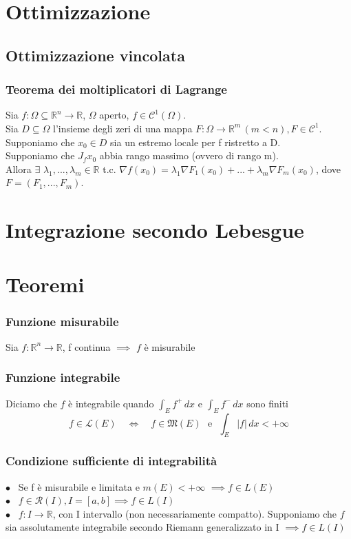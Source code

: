 \documentclass{article} %
\begin{document}
    \section{Ottimizzazione}
    \subsection*{Ottimizzazione vincolata}
    \subsubsection*{Teorema dei moltiplicatori di Lagrange}
    Sia $f:\Omega \subseteq \mathbb{R} ^n \to \mathbb{R}$, $\Omega$ aperto, $f \in \mathcal{C} ^1 (\Omega)$. \\ Sia $D \subseteq \Omega$ l'insieme degli zeri di una mappa $F: \Omega \to \mathbb{R} ^m \, (m<n), F \in \mathcal{C} ^1$. \\ Supponiamo che $x_0 \in D$ sia un estremo locale per f ristretto a D. \\ Supponiamo che $J_f{x_0}$ abbia rango massimo (ovvero di rango m). \\
    Allora $\exists$ $\lambda_1,...,\lambda_m \in \mathbb{R}$ t.c. $\nabla f(x_0) = \lambda_1 \nabla F_1(x_0) + ... + \lambda_m \nabla F_m(x_0)$, dove $F=(F_1, ... , F_m)$.


    \section{Integrazione secondo Lebesgue}
    \section{Teoremi}
    \subsubsection*{Funzione misurabile}
    Sia $f:\mathbb{R} ^n \to \mathbb{R} $, f continua $\implies$ $f$ è misurabile  

    \subsubsection*{Funzione integrabile}
    Diciamo che $f$ è integrabile quando $\int_{E}^{ }f^+\,dx$ e $\int_{E}^{ }f^-\,dx$ sono finiti
    $$ f \in \mathcal{L} (E) \, \, \, \, \, \,  \Longleftrightarrow \, \, \, \, \, \,  f \in \mathfrak{M} (E) \,\, \, \,  \text{e} \,\, \, \,  \int_{E}^{ }|f|\,dx < +\infty  $$

    \subsubsection*{Condizione sufficiente di integrabilità}
    $\bullet$ \, Se f è misurabile e limitata e $m(E) < + \infty$ $\implies f \in L(E)$ \\
    $\bullet$ \, $f \in \mathcal{R} (I), I=[a,b] \implies f \in L(I)$ \\
    $\bullet$ \, $f: I \to \mathbb{R}$, con I intervallo (non necessariamente compatto). Supponiamo che $f$ sia assolutamente integrabile secondo Riemann generalizzato in I $\implies f \in L(I)$
\end{document}
